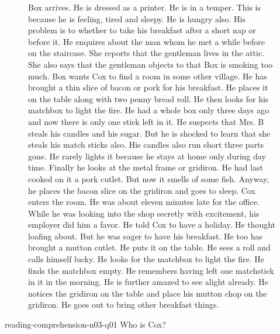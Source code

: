 {\begin{figure}[p]
    Box arrives. He is dressed as a printer. He is in a temper. This is because he is feeling, tired and sleepy. He is hungry also. His problem is to whether to take his breakfast after a short nap or before it. He enquires about the man whom he met a while before on the staircase. She reports that the gentleman lives in the attic. She also says that the gentleman objects to that Box is smoking too much. Box wants Cox to find a room in some other village. He has brought a thin slice of bacon or pork for his breakfast. He places it on the table along with two penny bread roll. He then looks for his matchbox to light the fire. He had a whole box only three days ago and now there is only one stick left in it. He suspects that Mrs. B steals his candles and his sugar. But he is shocked to learn that she steals his match sticks also. His candles also run short three parts gone. He rarely lights it because he stays at home only during day time. Finally he looks at the metal frame or gridiron. He had last cooked on it a pork cutlet. But now it smells of some fish. Anyway, he places the bacon slice on the gridiron and goes to sleep. Cox enters the room. He was about eleven minutes late for the office. While he was looking into the shop secretly with excitement, his employer did him a favor. He told Cox to have a holiday. He thought loafing about. But he was eager to have his breakfast. He too has brought a mutton cutlet. He puts it on the table. He sees a roll and calls himself lucky. He looks for the matchbox to light the fire. He finds the matchbox empty. He remembers having left one matchstick in it in the morning. He is further amazed to see alight already. He notices the gridiron on the table and place his mutton chop on the gridiron. He goes out to bring other breakfast things.
\end{figure}
\begin{question}{reading-comprehension-n03-q01}
    Who is Cox?
    \begin{choices}[o]
    \end{choices}
\end{question}
}

